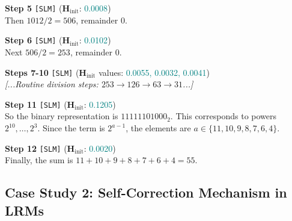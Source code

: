 \documentclass[11pt]{article}
\begin{document}
\begin{tcolorbox}
\noindent \textbf{Step 5} \texttt{[SLM]} {\scriptsize ($\mathbf{H}_\text{init}$: \textcolor{teal}{0.0008})} \\
Then $1012/2=506$, remainder $0$.

\noindent \textbf{Step 6} \texttt{[SLM]} {\scriptsize ($\mathbf{H}_\text{init}$: \textcolor{teal}{0.0102})} \\
Next $506/2=253$, remainder $0$.

\noindent \textbf{Steps 7-10} \texttt{[SLM]} {\scriptsize ($\mathbf{H}_\text{init}$ values: \textcolor{teal}{0.0055, 0.0032, 0.0041})} \\
\textit{[...Routine division steps: $253 \to 126 \to 63 \to 31$...]}

\noindent \textbf{Step 11} \texttt{[SLM]} {\scriptsize ($\mathbf{H}_\text{init}$: \textcolor{teal}{0.1205})} \\
So the binary representation is $11111101000_2$. This corresponds to powers $2^{10}, \dots, 2^3$. Since the term is $2^{a-1}$, the elements are $a \in \{11, 10, 9, 8, 7, 6, 4\}$.

\noindent \textbf{Step 12} \texttt{[SLM]} {\scriptsize ($\mathbf{H}_\text{init}$: \textcolor{teal}{0.0020})} \\
Finally, the sum is $11+10+9+8+7+6+4 = \boxed{55}$.

\end{tcolorbox}




\subsection{Case Study 2: Self-Correction Mechanism in LRMs}
\end{document}
